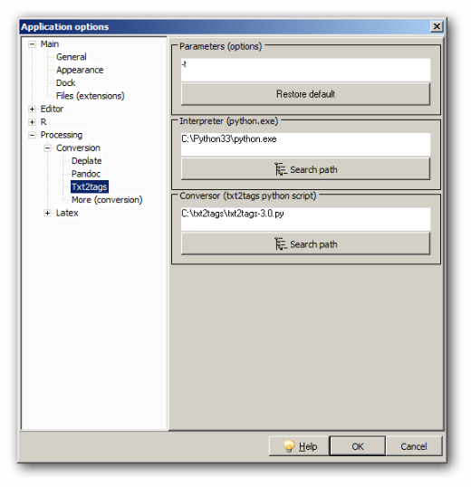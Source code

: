 \begin{itemize}
\begin{enumerate}
        \includegraphics[scale=0.50]{./res/app_processing_conversion_txt2tags.png}\\
    \end{enumerate}
\end{itemize}
